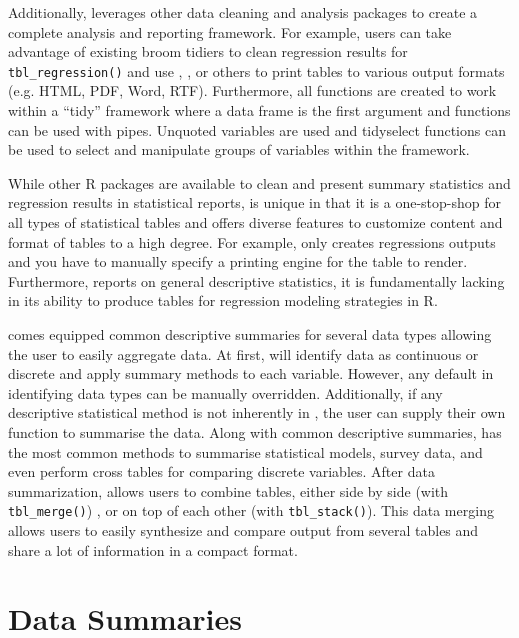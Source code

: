 Additionally,  leverages other data cleaning and analysis packages to create a complete analysis and reporting framework.
For example, users can take advantage of existing broom tidiers to clean regression results for \texttt{tbl\_regression()} and use , ,  or others to print  tables to various output formats (e.g. HTML, PDF, Word, RTF).
Furthermore, all  functions are created to work within a “tidy” framework where a data frame is the first argument and functions can be used with pipes.
Unquoted variables are used and tidyselect functions can be used to select and manipulate groups of variables within the framework.

While other R packages are available to clean and present summary statistics and regression results in statistical reports,  is unique in that it is a one-stop-shop for all types of statistical tables and offers diverse features to customize content and format of tables to a high degree.
For example,  only creates regressions outputs and you have to manually specify a printing engine for the table to render.
Furthermore,  reports on general descriptive statistics, it is fundamentally lacking in its ability to produce tables for regression modeling strategies in R. 

 comes equipped common descriptive summaries for several data types allowing the user to easily aggregate data.
At first,  will identify data as continuous or discrete and apply summary methods to each variable. 
However, any default in identifying data types can be manually overridden. 
Additionally, if any descriptive statistical method is not inherently in , the user can supply their own function to summarise the data. 
Along with common descriptive summaries,  has the most common methods to summarise statistical models, survey data, and even perform cross tables for comparing discrete variables. 
After data summarization,  allows users to combine tables, either side by side (with \texttt{tbl\_merge()}) , or on top of each other (with \texttt{tbl\_stack()}). 
This data merging allows users to easily synthesize and compare output from several tables and share a lot of information in a compact format.   

\section{Data Summaries}

